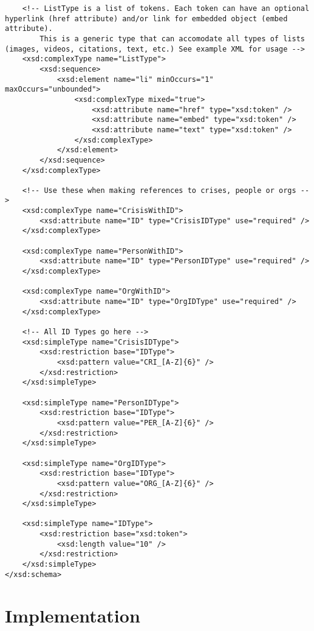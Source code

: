 \documentclass{article}
\begin{document}
\begin{lstlisting}
    <!-- ListType is a list of tokens. Each token can have an optional hyperlink (href attribute) and/or link for embedded object (embed attribute).
        This is a generic type that can accomodate all types of lists (images, videos, citations, text, etc.) See example XML for usage -->
    <xsd:complexType name="ListType">
        <xsd:sequence>
            <xsd:element name="li" minOccurs="1" maxOccurs="unbounded">
                <xsd:complexType mixed="true">
                    <xsd:attribute name="href" type="xsd:token" />
                    <xsd:attribute name="embed" type="xsd:token" />
                    <xsd:attribute name="text" type="xsd:token" />
                </xsd:complexType>
            </xsd:element>
        </xsd:sequence>
    </xsd:complexType>
    
    <!-- Use these when making references to crises, people or orgs -->
    <xsd:complexType name="CrisisWithID">
        <xsd:attribute name="ID" type="CrisisIDType" use="required" />
    </xsd:complexType>
    
    <xsd:complexType name="PersonWithID">
        <xsd:attribute name="ID" type="PersonIDType" use="required" />
    </xsd:complexType>
    
    <xsd:complexType name="OrgWithID">
        <xsd:attribute name="ID" type="OrgIDType" use="required" />
    </xsd:complexType>
    
    <!-- All ID Types go here -->
    <xsd:simpleType name="CrisisIDType">
        <xsd:restriction base="IDType">
            <xsd:pattern value="CRI_[A-Z]{6}" />
        </xsd:restriction>
    </xsd:simpleType>
    
    <xsd:simpleType name="PersonIDType">
        <xsd:restriction base="IDType">
            <xsd:pattern value="PER_[A-Z]{6}" />
        </xsd:restriction>
    </xsd:simpleType>
    
    <xsd:simpleType name="OrgIDType">
        <xsd:restriction base="IDType">
            <xsd:pattern value="ORG_[A-Z]{6}" />
        </xsd:restriction>
    </xsd:simpleType>

    <xsd:simpleType name="IDType">
        <xsd:restriction base="xsd:token">
            <xsd:length value="10" />
        </xsd:restriction>
    </xsd:simpleType>
</xsd:schema>
\end{lstlisting}

\newpage
\section*{Implementation}
\end{document}
